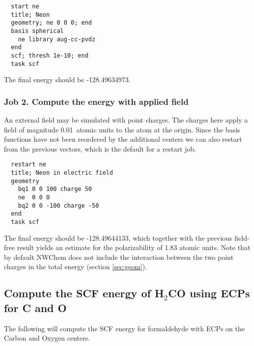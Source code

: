 \begin{verbatim}
  start ne
  title; Neon
  geometry; ne 0 0 0; end
  basis spherical 
    ne library aug-cc-pvdz
  end
  scf; thresh 1e-10; end
  task scf
\end{verbatim}

The final energy should be -128.49634973.

\subsubsection{Job 2. Compute the energy with applied field}

An external field may be simulated with point charges.  The charges
here apply a field of magnitude 0.01\ atomic units to the atom at the
origin.  Since the basis functions have not been reordered by the
additional centers we can also restart from the previous vectors,
which is the default for a restart job.

\begin{verbatim}
  restart ne
  title; Neon in electric field
  geometry
    bq1 0 0 100 charge 50
    ne  0 0 0
    bq2 0 0 -100 charge -50
  end
  task scf
\end{verbatim}

The final energy should be -128.49644133, which together with the
previous field-free result yields an estimate for the polarizability
of 1.83 atomic units.  Note that by default NWChem does not include
the interaction between the two point charges in the total energy
(section \ref{sec:geom}).

\subsection{Compute the SCF energy of H$_2$CO using ECPs for C and O}

The following will compute the SCF energy for formaldehyde with ECPs
on the Carbon and Oxygen centers.

